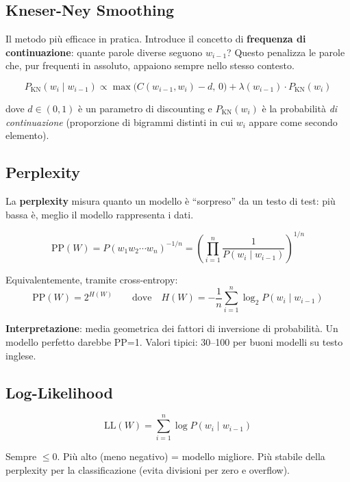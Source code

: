 \documentclass[12pt,a4paper]{article}
\begin{document}
\subsection{Kneser-Ney Smoothing}

Il metodo più efficace in pratica. Introduce il concetto di \textbf{frequenza di continuazione}: quante parole diverse seguono $w_{i-1}$? Questo penalizza le parole che, pur frequenti in assoluto, appaiono sempre nello stesso contesto.

\begin{formulabox}
\[
P_{\text{KN}}(w_i \mid w_{i-1}) \propto \max\!\bigl(C(w_{i-1}, w_i) - d,\, 0\bigr) + \lambda(w_{i-1}) \cdot P_{\text{KN}}(w_i)
\]
\end{formulabox}
dove $d \in (0,1)$ è un parametro di discounting e $P_{\text{KN}}(w_i)$ è la probabilità \emph{di continuazione} (proporzione di bigrammi distinti in cui $w_i$ appare come secondo elemento).

\subsection{Perplexity}

La \textbf{perplexity} misura quanto un modello è ``sorpreso'' da un testo di test: più bassa è, meglio il modello rappresenta i dati.

\begin{formulabox}
\[
\text{PP}(W) = P(w_1 w_2 \cdots w_n)^{-1/n} = \left(\prod_{i=1}^{n} \frac{1}{P(w_i \mid w_{i-1})}\right)^{1/n}
\]
\end{formulabox}

Equivalentemente, tramite cross-entropy:
\[
\text{PP}(W) = 2^{H(W)} \qquad \text{dove} \quad H(W) = -\frac{1}{n}\sum_{i=1}^n \log_2 P(w_i \mid w_{i-1})
\]

\textbf{Interpretazione}: media geometrica dei fattori di inversione di probabilità. Un modello perfetto darebbe PP=1. Valori tipici: 30--100 per buoni modelli su testo inglese.

\subsection{Log-Likelihood}

\begin{formulabox}
\[
\text{LL}(W) = \sum_{i=1}^{n} \log P(w_i \mid w_{i-1})
\]
\end{formulabox}

Sempre $\leq 0$. Più alto (meno negativo) = modello migliore. Più stabile della perplexity per la classificazione (evita divisioni per zero e overflow).
\end{document}
